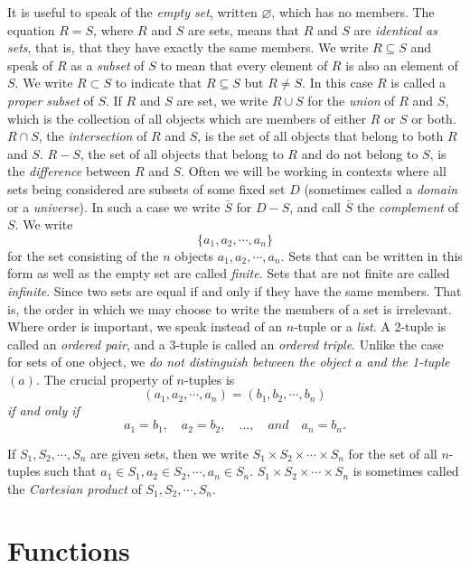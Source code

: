 \documentclass[a4paper,10pt,twoside]{book}
\begin{document}
It is useful to speak of the \textit{empty set}, written $\varnothing$, which has no members. The equation $R=S$, where $R$ and $S$ are sets, means that $R$ and $S$ are \textit{identical as sets}, that is, that they have exactly the same members. We write $R\subseteq S$ and speak of $R$ as a \textit{subset} of $S$ to mean that every element of $R$ is also an element of $S$. We write $R\subset S$ to indicate that $R\subseteq S$ but $R\neq S$. In this case $R$ is called a \textit{proper subset} of $S$. If $R$ and $S$ are set, we write $R\cup S$ for the \textit{union} of $R$ and $S$, which is the collection of all objects which are members of either $R$ or $S$ or both. $R\cap S$, the \textit{intersection} of $R$ and $S$, is the set of all objects that belong to both $R$ and $S$. $R-S$, the set of all objects that belong to $R$ and do not belong to $S$, is the \textit{difference} between $R$ and $S$. Often we will be working in contexts where all sets being considered are subsets of some fixed set $D$ (sometimes called a \textit{domain} or a \textit{universe}). In such a case we write $\bar{S}$ for $D-S$, and call $\bar{S}$ the \textit{complement} of $S$. We write $$\{a_1,a_2,\cdots,a_n\}$$ for the set consisting of the $n$ objects $a_1,a_2,\cdots,a_n$. Sets that can be written in this form as well as the empty set are called \textit{finite}. Sets that are not finite are called \textit{infinite}. Since two sets are equal if and only if they have the same members. That is, the order in which we may choose to write the members of a set is irrelevant. Where order is important, we speak instead of an $n$-tuple or a \textit{list}. A 2-tuple is called an \textit{ordered pair}, and a 3-tuple is called an \textit{ordered triple}. Unlike the case for sets of one object, we \textit{do not distinguish between the object $a$ and the 1-tuple $(a)$}. The crucial property of $n$-tuples is $$(a_1,a_2,\cdots,a_n)=(b_1,b_2,\cdots,b_n)$$ \textit{if and only if} $$a_{1}=b_{1} ,\quad a_{2}=b_{2} ,\quad\ldots,\quad and\quad a_{n}=b_{n}.$$

If $S_1,S_2,\cdots,S_n$ are given sets, then we write $S_1\times S_2\times\cdots\times S_n$ for the set of all $n$-tuples such that $a_1\in S_1,a_2\in S_2,\cdots,a_n\in S_n$. $S_1\times S_2\times\cdots\times S_n$ is sometimes called the \textit{Cartesian product} of $S_1,S_2,\cdots,S_n$.

\section{Functions}
\end{document}

